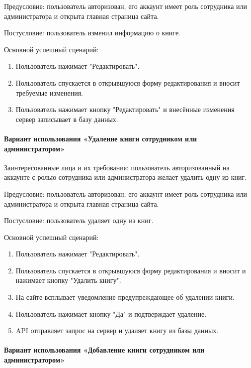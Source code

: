 Предусловие: пользователь авторизован, его аккаунт имеет роль сотрудника или администратора и открыта главная страница сайта.

Постусловие: пользователь изменил информацию о книге.

Основной успешный сценарий:

\begin{enumerate}
	\item Пользователь нажимает "Редактировать".
	\item Пользователь спускается в открывшуюся форму редактирования и вносит требуемые изменения.
	\item Пользователь нажимает кнопку "Редактировать" и внесённые изменения сервер записывает в базу данных.
\end{enumerate}


\paragraph{Вариант использования «Удаление книги сотрудником или администратором»}

Заинтересованные лица и их требования: пользователь авторизованный на аккаунте с ролью сотрудника или администратора желает удалить одну из книг.

Предусловие: пользователь авторизован, его аккаунт имеет роль сотрудника или администратора и открыта главная страница сайта.

Постусловие: пользователь удаляет одну из книг.

Основной успешный сценарий:

\begin{enumerate}
	\item Пользователь нажимает "Редактировать".
	\item Пользователь спускается в открывшуюся форму редактирования и вносит и нажимает кнопку "Удалить книгу".
	\item На сайте всплывает уведомление предупреждающее об удалении книги.
	\item Пользователь нажимает кнопку "Да" и подтверждает удаление.
	\item API отправляет запрос на сервер и удаляет книгу из базы данных.
\end{enumerate}


\paragraph{Вариант использования «Добавление книги сотрудником или администратором»}


